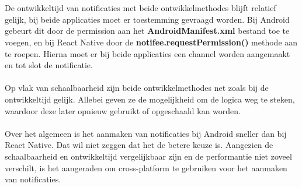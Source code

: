 \\\\
De ontwikkeltijd van notificaties met beide ontwikkelmethodes blijft relatief gelijk, 
bij beide applicaties moet er toestemming gevraagd worden. 
Bij Android gebeurt dit door de permission aan het \textbf{AndroidManifest.xml} bestand toe te voegen, en bij React Native door 
de \textbf{notifee.requestPermission()} methode aan te roepen. Hierna moet er bij beide applicaties een 
channel worden aangemaakt en tot slot de notificatie.
\\\\
Op vlak van schaalbaarheid zijn beide ontwikkelmethodes net zoals bij de ontwikkeltijd 
gelijk. Allebei geven ze de mogelijkheid om de logica weg te steken, 
waardoor deze later opnieuw gebruikt of opgeschaald kan worden.
\\\\
Over het algemeen is het aanmaken van notificaties bij Android sneller dan bij
React Native. Dat wil niet zeggen dat het de betere keuze is. Aangezien de schaalbaarheid
en ontwikkeltijd vergelijkbaar zijn en de performantie niet zoveel verschilt, is het 
aangeraden om cross-platform te gebruiken voor het aanmaken van notificaties.























